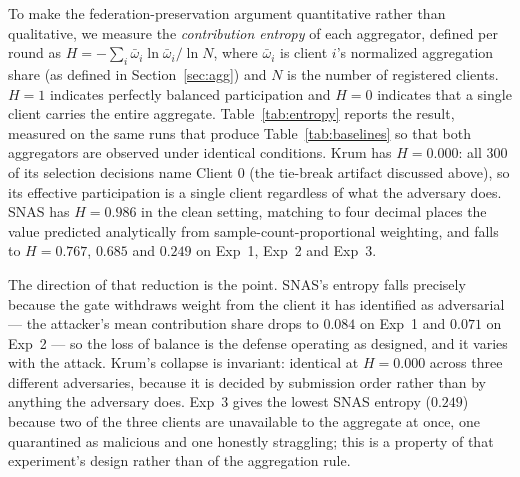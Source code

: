 \documentclass[pdflatex,sn-mathphys-num]{sn-jnl}
\begin{document}
To make the federation-preservation argument quantitative rather than qualitative, we measure the \emph{contribution entropy} of each aggregator, defined per round as $H = -\sum_{i} \bar{\omega}_i \ln \bar{\omega}_i / \ln N$, where $\bar{\omega}_i$ is client $i$'s normalized aggregation share (as defined in Section~\ref{sec:agg}) and $N$ is the number of registered clients. $H=1$ indicates perfectly balanced participation and $H=0$ indicates that a single client carries the entire aggregate. Table~\ref{tab:entropy} reports the result, measured on the same runs that produce Table~\ref{tab:baselines} so that both aggregators are observed under identical conditions. Krum has $H=0.000$: all 300 of its selection decisions name Client 0 (the tie-break artifact discussed above), so its effective participation is a single client regardless of what the adversary does. SNAS has $H=0.986$ in the clean setting, matching to four decimal places the value predicted analytically from sample-count-proportional weighting, and falls to $H=0.767$, $0.685$ and $0.249$ on Exp~1, Exp~2 and Exp~3.

The direction of that reduction is the point. SNAS's entropy falls precisely because the gate withdraws weight from the client it has identified as adversarial --- the attacker's mean contribution share drops to $0.084$ on Exp~1 and $0.071$ on Exp~2 --- so the loss of balance is the defense operating as designed, and it varies with the attack. Krum's collapse is invariant: identical at $H=0.000$ across three different adversaries, because it is decided by submission order rather than by anything the adversary does. Exp~3 gives the lowest SNAS entropy ($0.249$) because two of the three clients are unavailable to the aggregate at once, one quarantined as malicious and one honestly straggling; this is a property of that experiment's design rather than of the aggregation rule.
\end{document}
